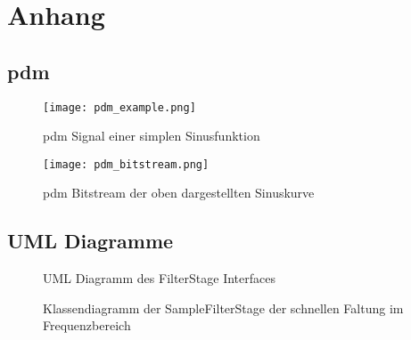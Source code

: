\graphicspath{{./figures/}}
\chapter*{Anhang}
\renewcommand{\thesection}{\Alph{section}}

\section{\acl*{pdm}}
\label{sec:app_pdm}
\begin{figure}[htbp]
    \centering
    \texttt{[image: pdm\_example.png]}
    \caption[Beispiel eines \acs*{pdm} Signals]{\acs*{pdm} Signal einer simplen Sinusfunktion }
\end{figure}

\begin{figure}[htbp]
    \centering
    \texttt{[image: pdm\_bitstream.png]}
    \caption[Beispiel eines \acs*{pdm} Bitstreams]{\acs*{pdm} Bitstream der oben dargestellten Sinuskurve}
\end{figure}
\FloatBarrier
\newpage

\section{UML Diagramme}
\label{sec:class_diag_filterstages}

\begin{figure}[h]
    \centering
    
    \caption[UML Diagramm des FilterStage Interfaces]{UML Diagramm des FilterStage Interfaces}
\end{figure}
\FloatBarrier

\newpage
\begin{figure}[htbp]
    \centering
    
    \caption[UML der SampleFilterStage]{Klassendiagramm der SampleFilterStage der schnellen Faltung im Frequenzbereich}
\end{figure}

\newpage
